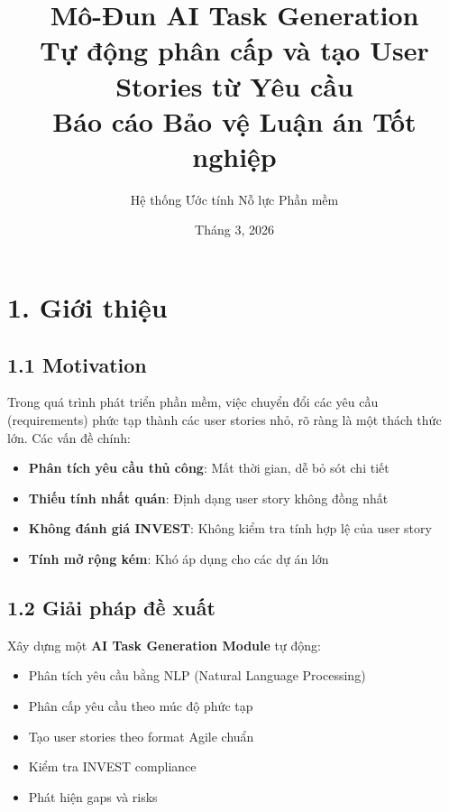 \documentclass[12pt,a4paper]{article}
\title{
    \textbf{Mô-Đun AI Task Generation}\\
    \large Tự động phân cấp và tạo User Stories từ Yêu cầu\\
    \vspace{0.5cm}
    \normalsize Báo cáo Bảo vệ Luận án Tốt nghiệp
}
\author{Hệ thống Ước tính Nỗ lực Phần mềm}
\date{Tháng 3, 2026}
\begin{document}
\maketitle

\clearpage
\tableofcontents
\clearpage

\section{1. Giới thiệu}

\subsection{1.1 Motivation}
Trong quá trình phát triển phần mềm, việc chuyển đổi các yêu cầu (requirements) phức tạp thành các user stories nhỏ, rõ ràng là một thách thức lớn. Các vấn đề chính:

\begin{itemize}
    \item \textbf{Phân tích yêu cầu thủ công}: Mất thời gian, dễ bỏ sót chi tiết
    \item \textbf{Thiếu tính nhất quán}: Định dạng user story không đồng nhất
    \item \textbf{Không đánh giá INVEST}: Không kiểm tra tính hợp lệ của user story
    \item \textbf{Tính mở rộng kém}: Khó áp dụng cho các dự án lớn
\end{itemize}

\subsection{1.2 Giải pháp đề xuất}
Xây dựng một \textbf{AI Task Generation Module} tự động:
\begin{itemize}
    \item Phân tích yêu cầu bằng NLP (Natural Language Processing)
    \item Phân cấp yêu cầu theo múc độ phức tạp
    \item Tạo user stories theo format Agile chuẩn
    \item Kiểm tra INVEST compliance
    \item Phát hiện gaps và risks
\end{itemize}

\end{document}
